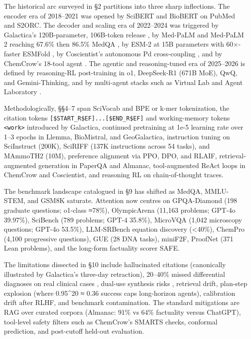 \documentclass{article}
\begin{document}
The historical arc surveyed in §2 partitions into three sharp inflections. The encoder era of 2018--2021 was opened by SciBERT \cite{beltagy2019arxiv1903106762019} and BioBERT \cite{lee2019bioinformatics2019} on PubMed and S2ORC. The decoder and scaling era of 2022--2024 was triggered by Galactica's 120B-parameter, 106B-token release \cite{taylor2022arxiv2211090852022}, by Med-PaLM and Med-PaLM 2 reaching 67.6\% then 86.5\% MedQA \cite{singhal2025towardexpertlevelm,singhal2023largelanguagemodel}, by ESM-2 at 15B parameters with 60×-faster ESMFold \cite{lin2022evolutionaryscalep}, by Coscientist's autonomous Pd cross-coupling \cite{boiko2023nature6242023}, and by ChemCrow's 18-tool agent \cite{bran2024naturemachineintel}. The agentic and reasoning-tuned era of 2025--2026 is defined by reasoning-RL post-training in o1, DeepSeek-R1 (671B MoE), QwQ, and Gemini-Thinking, and by multi-agent stacks such as Virtual Lab \cite{swanson2024thevirtuallabaiage} and Agent Laboratory \cite{schmidgall2025agentlaboratoryusi}.

Methodologically, §§4--7 span SciVocab and BPE or k-mer tokenization, the citation tokens \texttt{{[}\$START\_R\$EF{]}...{[}\$END\_R\$EF{]}} and working-memory tokens \texttt{\textless{}work\textgreater{}} introduced by Galactica, continued pretraining at 1e-5 learning rate over 1--3 epochs in Llemma, BioMistral, and GeoGalactica, instruction tuning on SciInstruct (200K), SciRIFF (137K instructions across 54 tasks), and MAmmoTH2 (10M), preference alignment via PPO, DPO, and RLAIF, retrieval-augmented generation in PaperQA and Almanac, tool-augmented ReAct loops in ChemCrow and Coscientist, and reasoning RL on chain-of-thought traces.

The benchmark landscape catalogued in §9 has shifted as MedQA, MMLU-STEM, and GSM8K saturate. Attention now centres on GPQA-Diamond (198 graduate questions; o1-class ≈78\%), OlympicArena (11,163 problems; GPT-4o 39.97\%), SciBench (789 problems; GPT-4 35.8\%), MicroVQA (1,042 microscopy questions; GPT-4o 53.5\%), LLM-SRBench equation discovery (\textless40\%), ChemPro (4,100 progressive questions), GUE (28 DNA tasks), miniF2F, ProofNet (371 Lean problems), and the long-form factuality scorer SAFE.

The limitations dissected in §10 include hallucinated citations (canonically illustrated by Galactica's three-day retraction), 20--40\% missed differential diagnoses on real clinical cases \cite{hager2024evaluationandmitig}, dual-use synthesis risks \cite{bengio2024internationalscien}, retrieval drift, plan-step explosion (where 0.95\^{}20 ≈ 0.36 success caps long-horizon agents), calibration drift after RLHF, and benchmark contamination. The standard mitigations are RAG over curated corpora (Almanac: 91\% vs 64\% factuality versus ChatGPT), tool-level safety filters such as ChemCrow's SMARTS checks, conformal prediction, and post-cutoff held-out evaluation.
\end{document}
